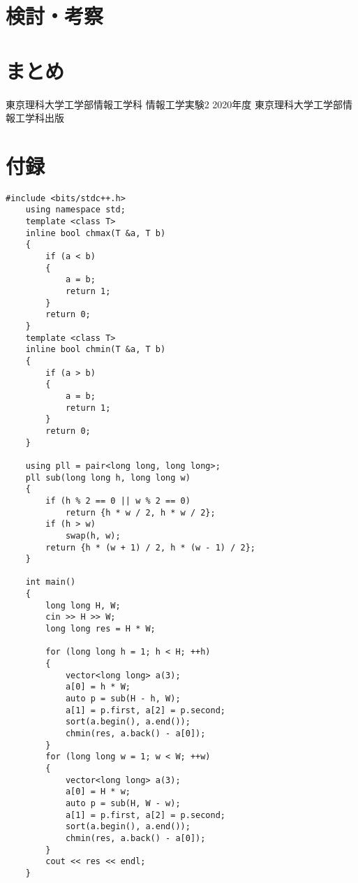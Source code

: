 \documentclass[12pt]{jarticle}
\begin{document}
\section{検討・考察}

\section{まとめ}


\clearpage

\begin{thebibliography}{99}
    \label{sannkoubunnkenn_chapter}
    東京理科大学工学部情報工学科 情報工学実験2 2020年度
    東京理科大学工学部情報工学科出版

\end{thebibliography}


\clearpage

\appendix
\section{付録}
\begin{lstlisting}[style = lstcpp,caption=saiteki.cpp]
    #include <bits/stdc++.h>
    using namespace std;
    template <class T>
    inline bool chmax(T &a, T b)
    {
        if (a < b)
        {
            a = b;
            return 1;
        }
        return 0;
    }
    template <class T>
    inline bool chmin(T &a, T b)
    {
        if (a > b)
        {
            a = b;
            return 1;
        }
        return 0;
    }
    
    using pll = pair<long long, long long>;
    pll sub(long long h, long long w)
    {
        if (h % 2 == 0 || w % 2 == 0)
            return {h * w / 2, h * w / 2};
        if (h > w)
            swap(h, w);
        return {h * (w + 1) / 2, h * (w - 1) / 2};
    }
    
    int main()
    {
        long long H, W;
        cin >> H >> W;
        long long res = H * W;
    
        for (long long h = 1; h < H; ++h)
        {
            vector<long long> a(3);
            a[0] = h * W;
            auto p = sub(H - h, W);
            a[1] = p.first, a[2] = p.second;
            sort(a.begin(), a.end());
            chmin(res, a.back() - a[0]);
        }
        for (long long w = 1; w < W; ++w)
        {
            vector<long long> a(3);
            a[0] = H * w;
            auto p = sub(H, W - w);
            a[1] = p.first, a[2] = p.second;
            sort(a.begin(), a.end());
            chmin(res, a.back() - a[0]);
        }
        cout << res << endl;
    }
\end{lstlisting}


\end{document}
